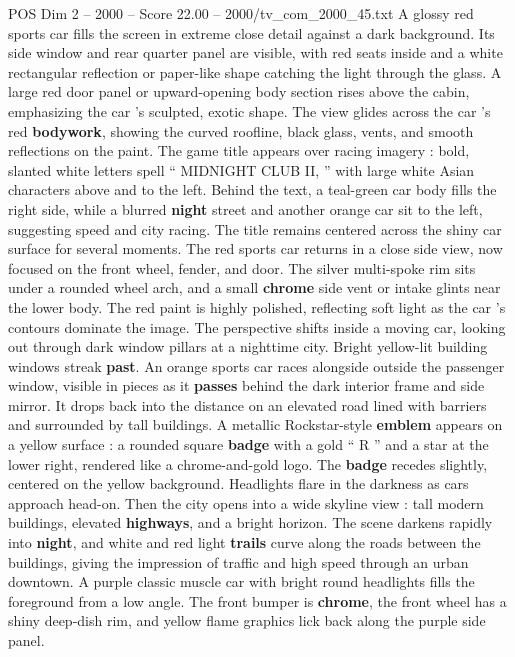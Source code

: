 \begin{textsample}{POS Dim 2 – 2000 – Score 22.00 – 2000/tv\_com\_2000\_45.txt}  \label{ex:f2_pos_025}
A glossy red sports car fills the screen in extreme close detail against a dark background.
Its side window and rear quarter panel are visible, with red seats inside and a white rectangular reflection or paper-like shape catching the light through the glass.
A large red door panel or upward-opening body section rises above the cabin, emphasizing the car ’s sculpted, exotic shape.
The view glides across the car ’s red \textbf{bodywork}, showing the curved roofline, black glass, vents, and smooth reflections on the paint.
The game title appears over racing imagery : bold, slanted white letters spell “ MIDNIGHT CLUB II, ” with large white Asian characters above and to the left.
Behind the text, a teal-green car body fills the right side, while a blurred \textbf{night} street and another orange car sit to the left, suggesting speed and city racing.
The title remains centered across the shiny car surface for several moments.
The red sports car returns in a close side view, now focused on the front wheel, fender, and door.
The silver multi-spoke rim sits under a rounded wheel arch, and a small \textbf{chrome} side vent or intake glints near the lower body.
The red paint is highly polished, reflecting soft light as the car ’s contours dominate the image.
The perspective shifts inside a moving car, looking out through dark window pillars at a nighttime city.
Bright yellow-lit building windows streak \textbf{past}.
An orange sports car races alongside outside the passenger window, visible in pieces as it \textbf{passes} behind the dark interior frame and side mirror.
It drops back into the distance on an elevated road lined with barriers and surrounded by tall buildings.
A metallic Rockstar-style \textbf{emblem} appears on a yellow surface : a rounded square \textbf{badge} with a gold “ R ” and a star at the lower right, rendered like a chrome-and-gold logo.
The \textbf{badge} recedes slightly, centered on the yellow background.
Headlights flare in the darkness as cars approach head-on.
Then the city opens into a wide skyline view : tall modern buildings, elevated \textbf{highways}, and a bright horizon.
The scene darkens rapidly into \textbf{night}, and white and red light \textbf{trails} curve along the roads between the buildings, giving the impression of traffic and high speed through an urban downtown.
A purple classic muscle car with bright round headlights fills the foreground from a low angle.
The front bumper is \textbf{chrome}, the front wheel has a shiny deep-dish rim, and yellow flame graphics lick back along the purple side panel.

\end{textsample}
